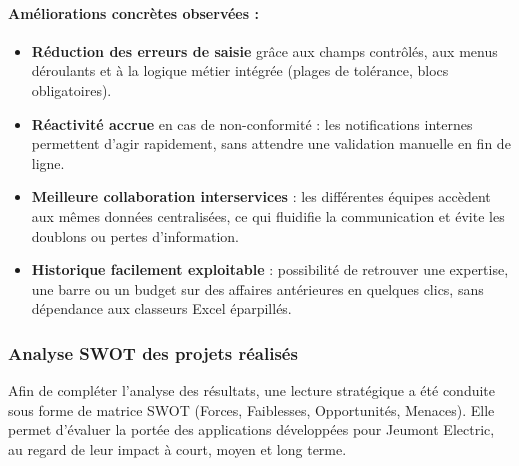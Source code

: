 \documentclass[11pt,a4paper]{article}
\begin{document}
\paragraph{Améliorations concrètes observées :}

\begin{itemize}
    \item \textbf{Réduction des erreurs de saisie} grâce aux champs contrôlés, aux menus déroulants et à la logique métier intégrée (plages de tolérance, blocs obligatoires).
    
    \item \textbf{Réactivité accrue} en cas de non-conformité : les notifications internes permettent d’agir rapidement, sans attendre une validation manuelle en fin de ligne.
    
    \item \textbf{Meilleure collaboration interservices} : les différentes équipes accèdent aux mêmes données centralisées, ce qui fluidifie la communication et évite les doublons ou pertes d’information.
    
    \item \textbf{Historique facilement exploitable} : possibilité de retrouver une expertise, une barre ou un budget sur des affaires antérieures en quelques clics, sans dépendance aux classeurs Excel éparpillés.
\end{itemize}

\newpage
\subsubsection{Analyse SWOT des projets réalisés}

Afin de compléter l’analyse des résultats, une lecture stratégique a été conduite sous forme de matrice SWOT (Forces, Faiblesses, Opportunités, Menaces). Elle permet d’évaluer la portée des applications développées pour Jeumont Electric, au regard de leur impact à court, moyen et long terme.
\end{document}
